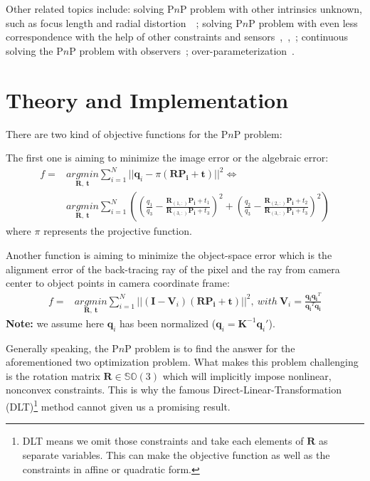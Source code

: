 \documentclass[a4paper]{article}
\begin{document}
Other related topics include: solving P$n$P problem with other intrinsics unknown, such as focus length and radial distortion~\cite{pop00010}~\cite{zheng2016direct}; solving P$n$P problem with even less correspondence with the help of other constraints and sensors~\cite{pylvanainen2009revisiting},~\cite{d2014use},~\cite{d2013use}; continuous solving the P$n$P problem with observers~\cite{pop00016}; over-parameterization~\cite{pop00018}.

\section{Theory and Implementation}
There are two kind of objective functions for the P$n$P problem:

The first one is aiming to minimize the image error or the algebraic error:
\begin{align*}
f =& \underset{\mathbf{R},\ \mathbf{t}}{argmin} \sum_{i=1}^{N}||\mathbf{q}_i-\pi(\mathbf{R}\mathbf{P_i}+\mathbf{t})||^2 \Leftrightarrow \\
 &\underset{\mathbf{R},\ \mathbf{t}}{argmin} \sum_{i=1}^{N}\left((\frac{q_1}{q_3}-\frac{\mathbf{R}_(1,:)\mathbf{P_i}+t_1}{\mathbf{R}_(3,:)\mathbf{P_i}+t_3})^{2}+(\frac{q_2}{q_3}-\frac{\mathbf{R}_(2,:)\mathbf{P_i}+t_2}{\mathbf{R}_(3,:)\mathbf{P_i}+t_3})^{2}
 \right)
\end{align*}
where $\pi$ represents the projective function.

Another function is aiming to minimize the object-space error which is the alignment error of the back-tracing ray of the pixel and the ray from camera center to object points in camera coordinate frame:
\begin{align*}
f =& \underset{\mathbf{R},\ \mathbf{t}}{argmin} \sum_{i=1}^{N}||(\mathbf{I}-\mathbf{V}_i)(\mathbf{R}\mathbf{P_i}+\mathbf{t})||^2,\ with\ \mathbf{V}_i = \frac{\mathbf{q_iq_i}^T}{\mathbf{q_i}^T\mathbf{q_i}}
\end{align*}
\textbf{Note:} we assume here $\mathbf{q}_i$ has been normalized ($\mathbf{q}_i = \mathbf{K}^{-1}\mathbf{q}_i'$).

Generally speaking, the P$n$P problem is to find the answer for the aforementioned two optimization problem. What makes this problem challenging is the rotation matrix $\mathbf{R}\in \mathbb{SO}(3)$ which will implicitly impose nonlinear, nonconvex constraints. This is why the famous Direct-Linear-Transformation (DLT)\footnote{DLT means we omit those constraints and take each elements of $\mathbf{R}$ as separate variables. This can make the objective function as well as the constraints in affine or quadratic form.} method cannot given us a promising result.
\end{document}
